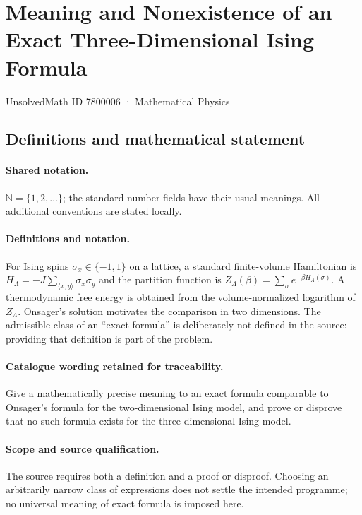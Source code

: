 \documentclass[11pt]{article}
\begin{document}
\setcounter{section}{7800005}
\section{Meaning and Nonexistence of an Exact Three-Dimensional Ising Formula}\label{7800006}
{\small UnsolvedMath ID 7800006 · Mathematical Physics}
\subsection{Definitions and mathematical statement}

\paragraph{Shared notation.}$\mathbb N=\{1,2,\ldots\}$; the standard number fields have their usual meanings. All additional conventions are stated locally.


\paragraph{Definitions and notation.}For Ising spins $\sigma_x\in\{-1,1\}$ on a lattice, a standard finite-volume Hamiltonian is $H_\Lambda=-J\sum_{\langle x,y\rangle}\sigma_x\sigma_y$ and the partition function is $Z_\Lambda(\beta)=\sum_\sigma e^{-\beta H_\Lambda(\sigma)}$. A thermodynamic free energy is obtained from the volume-normalized logarithm of $Z_\Lambda$. Onsager’s solution motivates the comparison in two dimensions. The admissible class of an ``exact formula'' is deliberately not defined in the source: providing that definition is part of the problem.

\paragraph{Catalogue wording retained for traceability.}
Give a mathematically precise meaning to an exact formula comparable to Onsager's formula for the two-dimensional Ising model, and prove or disprove that no such formula exists for the three-dimensional Ising model.
\paragraph{Scope and source qualification.}The source requires both a definition and a proof or disproof. Choosing an arbitrarily narrow class of expressions does not settle the intended programme; no universal meaning of exact formula is imposed here.
\end{document}
